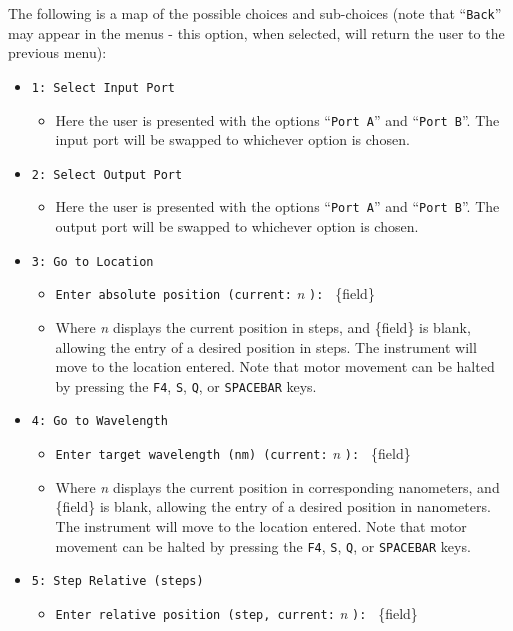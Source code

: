 \documentclass{article}
\begin{document}
The following is a map of the possible choices and sub-choices (note that ``\verb|Back|'' may appear in the menus - this option, when selected, will return the user to the previous menu):

\begin{itemize}
    \item \verb|1: Select Input Port|
    \begin{itemize}
        \item Here the user is presented with the options ``\verb|Port A|'' and ``\verb|Port B|''. The input port will be swapped to whichever option is chosen.
    \end{itemize}
    \item \verb|2: Select Output Port|
    \begin{itemize}
        \item Here the user is presented with the options ``\verb|Port A|'' and ``\verb|Port B|''. The output port will be swapped to whichever option is chosen.
    \end{itemize}
    \item \verb|3: Go to Location|
    \begin{itemize}
        \item \verb|Enter absolute position (current:| \emph{n} \verb|): | \{field\}
        \item Where \emph{n} displays the current position in steps, and \{field\} is blank, allowing the entry of a desired position in steps. The instrument will move to the location entered. Note that motor movement can be halted by pressing the \verb|F4|, \verb|S|, \verb|Q|, or \verb|SPACEBAR| keys.
    \end{itemize}
    \item \verb|4: Go to Wavelength|
    \begin{itemize}
        \item \verb|Enter target wavelength (nm) (current:| \emph{n} \verb|): | \{field\}
        \item Where \emph{n} displays the current position in corresponding nanometers, and \{field\} is blank, allowing the entry of a desired position in nanometers. The instrument will move to the location entered. Note that motor movement can be halted by pressing the \verb|F4|, \verb|S|, \verb|Q|, or \verb|SPACEBAR| keys.
    \end{itemize}
    \item \verb|5: Step Relative (steps)|
    \begin{itemize}
        \item \verb|Enter relative position (step, current:| \emph{n} \verb|): | \{field\}

\end{itemize}
\end{itemize}
\end{document}
